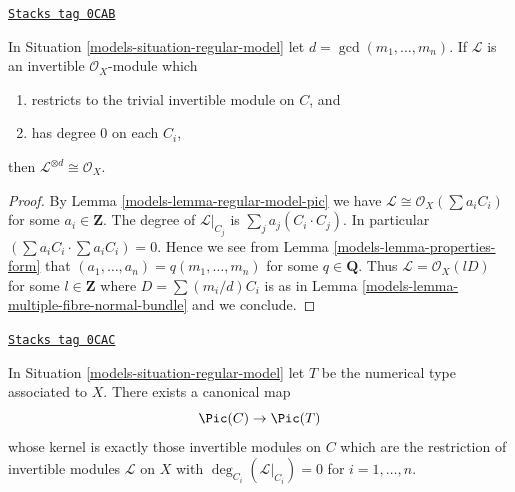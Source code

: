 \begin{lemma}
\label{models-lemma-characterize-trivial}
\href{https://stacks.math.columbia.edu/tag/0CAB}{\texttt{Stacks tag 0CAB}}

In Situation \ref{models-situation-regular-model} let $d = \gcd(m_1, \ldots, m_n)$.
If $\mathcal{L}$ is an invertible $\mathcal{O}_X$-module which
\begin{enumerate}
\item restricts to the trivial invertible module on $C$, and
\item has degree $0$ on each $C_i$,
\end{enumerate}
then $\mathcal{L}^{\otimes d} \cong \mathcal{O}_X$.
\end{lemma}

\begin{proof}

By Lemma \ref{models-lemma-regular-model-pic} we have
$\mathcal{L} \cong \mathcal{O}_X(\sum a_i C_i)$ for some
$a_i \in \mathbf{Z}$. The degree of $\mathcal{L}|_{C_j}$
is $\sum_j a_j(C_i \cdot C_j)$. In particular
$(\sum a_i C_i \cdot \sum a_i C_i) = 0$.
Hence we see from Lemma \ref{models-lemma-properties-form}
that $(a_1, \ldots, a_n) = q(m_1, \ldots, m_n)$ for some
$q \in \mathbf{Q}$. Thus $\mathcal{L} = \mathcal{O}_X(lD)$
for some $l \in \mathbf{Z}$ where $D = \sum (m_i/d) C_i$ is as in
Lemma \ref{models-lemma-multiple-fibre-normal-bundle}
and we conclude.
\end{proof}

\begin{lemma}
\label{models-lemma-canonical-map-of-pic}
\href{https://stacks.math.columbia.edu/tag/0CAC}{\texttt{Stacks tag 0CAC}}

In Situation \ref{models-situation-regular-model}
let $T$ be the numerical type associated to $X$.
There exists a canonical map
$$
\Pic(C) \to \Pic(T)
$$
whose kernel is exactly those invertible modules on $C$
which are the restriction of invertible modules $\mathcal{L}$
on $X$ with $\deg_{C_i}(\mathcal{L}|_{C_i}) = 0$ for
$i = 1, \ldots, n$.
\end{lemma}

